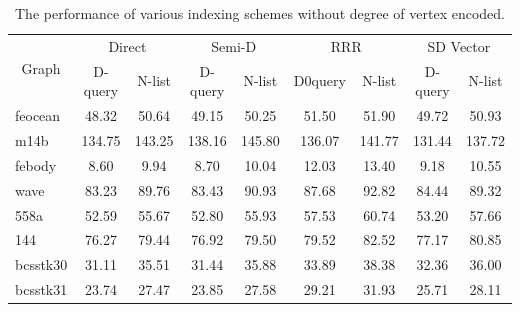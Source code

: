 \documentclass[12pt,glossary]{dalthesis}
\begin{document}
\begin{table}[h]
\centering
\caption{The performance of various indexing schemes without degree of vertex encoded.}
\label{my-label}
\begin{tabular}{|l||c|c||c|c||c|c||c|c|}
\hline
\multicolumn{1}{|c||}{\multirow{2}{*}{Graph}} & \multicolumn{2}{c||}{Direct} & \multicolumn{2}{c||}{Semi-D} & \multicolumn{2}{c||}{RRR} & \multicolumn{2}{c|}{SD Vector} \\
\cline{2-9}
\multicolumn{1}{|c||}{}                       & D-query      & N-list      & D-query      & N-list      & D0query     & N-list    & D-query        & N-list       \\ \hline
feocean                                    & 48.32        & 50.64       & 49.15        & 50.25       & 51.50       & 51.90     & 49.72          & 50.93        \\
m14b                                       & 134.75       & 143.25      & 138.16       & 145.80      & 136.07      & 141.77    & 131.44         & 137.72       \\
febody                                     & 8.60         & 9.94        & 8.70         & 10.04       & 12.03       & 13.40     & 9.18           & 10.55        \\
wave                                       & 83.23        & 89.76       & 83.43        & 90.93       & 87.68       & 92.82     & 84.44          & 89.32        \\
558a                                       & 52.59        & 55.67       & 52.80        & 55.93       & 57.53       & 60.74     & 53.20          & 57.66        \\
144                                        & 76.27        & 79.44       & 76.92        & 79.50       & 79.52       & 82.52     & 77.17          & 80.85        \\
bcsstk30                                   & 31.11        & 35.51       & 31.44        & 35.88       & 33.89       & 38.38     & 32.36          & 36.00        \\
bcsstk31                                   & 23.74        & 27.47       & 23.85        & 27.58       & 29.21       & 31.93     & 25.71          & 28.11        \\ \hline
\end{tabular}
\end{table}
\end{document}
